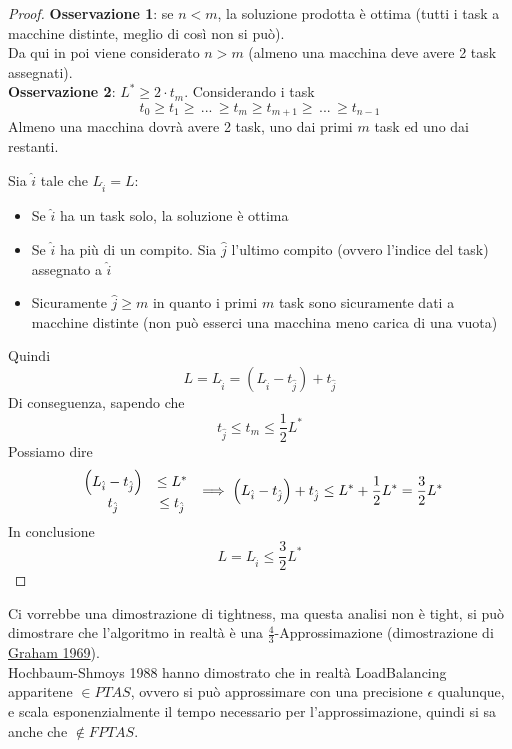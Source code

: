 \documentclass[11pt]{article}
\begin{document}
	\begin{proof}
		\textbf{Osservazione 1}: se $n<m$, la soluzione prodotta è ottima (tutti i task a macchine distinte, meglio di così non si può).\\
		
		Da qui in poi viene considerato $n>m$ (almeno una macchina deve avere 2 task assegnati).\\
		
		\textbf{Osservazione 2}: $L^\ast \geq 2 \cdot t_m$. Considerando i task
		$$ t_0 \geq t_1 \geq \, ... \, \geq t_m \geq t_{m+1} \geq \, ... \, \geq t_{n-1} $$
		Almeno una macchina dovrà avere 2 task, uno dai primi $m$ task ed uno dai restanti.\\
		
		\newpage
		
		Sia $\hat{i}$ tale che $L_{\hat{i}} = L$:
		\begin{itemize}
			\item Se $\hat{i}$ ha un task solo, la soluzione è ottima
			\item Se $\hat{i}$ ha più di un compito. Sia $\hat{j}$ l'ultimo compito (ovvero l'indice del task) assegnato a $\hat{i}$
			\item Sicuramente $\hat{j} \geq m$ in quanto i primi $m$ task sono sicuramente dati a macchine distinte (non può esserci una macchina meno carica di una vuota)
		\end{itemize}
		Quindi 
		$$ L = L_{\hat{i}} = \left(L_{\hat{i}} - t_{\hat{j}}\right) + t_{\hat{j}} $$  
		Di conseguenza, sapendo che
		$$ t_{\hat{j}} \leq t_m \leq \frac{1}{2} L^\ast $$
		Possiamo dire
		$$
		\begin{array}{c c}
			\left(L_{\hat{i}} - t_{\hat{j}}\right)  & \leq L^\ast \\
			t_{\hat{j}} & \leq t_{\hat{j}}
		\end{array}
		\implies
		\left(L_{\hat{i}} - t_{\hat{j}}\right) + t_{\hat{j}}  \leq L^\ast + \frac{1}{2} L^\ast = \frac{3}{2} L^\ast
		$$
		In conclusione
		$$ L = L_{\hat{i}} \leq \frac{3}{2}L^\ast $$
		
	\end{proof}
	
	Ci vorrebbe una dimostrazione di tightness, ma questa analisi non è tight, si può dimostrare che l'algoritmo in realtà è una $\frac{4}{3}$-Approssimazione (dimostrazione di \href{https://www.jstor.org/stable/pdf/2099572.pdf}{Graham 1969}).\\
	
	Hochbaum-Shmoys 1988 hanno dimostrato che in realtà LoadBalancing apparitene $\in PTAS$, ovvero si può approssimare con una precisione $\epsilon$ qualunque, e scala esponenzialmente il tempo necessario per l'approssimazione, quindi si sa anche che $\notin FPTAS$.\\
	
\end{document}
